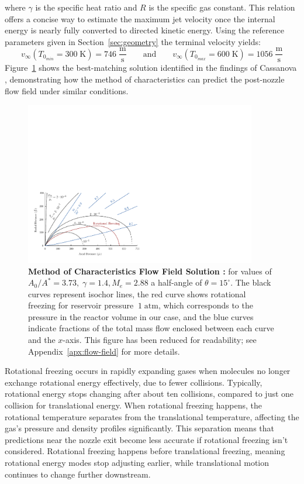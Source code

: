 		where $\gamma$ is the specific heat ratio and $R$ is the specific gas constant. This relation offers a concise way to estimate the maximum jet velocity once the internal energy is nearly fully converted to directed kinetic energy.
		Using the reference parameters given in Section~\ref{sec:geometry} the terminal velocity yields:
		$$
			v_\infty(T_{0_{min}} = 300\;\text{K}) = 746 \; \frac{\text{m}}{\text{s}}
				\qquad \text{and} \qquad
			v_\infty(T_{0_{max}} = 600\;\text{K}) = 1056 \; \frac{\text{m}}{\text{s}}
		$$
		\newpage
		Figure~\ref{fig:velocity-distribution-reduced} shows the best-matching solution identified in the findings of Cassanova \cite{Cassanova1965}, demonstrating how the method of characteristics can predict the post-nozzle flow field under similar conditions.
		\begin{figure}[H]
			\centering
		    \includegraphics[width=0.9\textwidth]{src/03_analytical-work/fig_velocity-distribution-reduced.pdf}
			\caption[Method of Characteristics Flow Field Solution \cite{Cassanova1965}]{
				\textbf{Method of Characteristics Flow Field Solution \cite{Cassanova1965}:}
				for values of $A_0/A^* = 3.73,\;\gamma=1.4,M_e =2.88$ a half-angle of $\theta = 15^\circ$.
				The black curves represent isochor lines, the red curve shows rotational freezing for reservoir pressure $~1\;\text{atm}$, which corresponds to the pressure in the reactor volume in our case, and the blue curves indicate fractions of the total mass flow enclosed between each curve and the $x$-axis. 
				This figure has been reduced for readability; see Appendix~\ref{apx:flow-field} for more details.
			}
			\label{fig:velocity-distribution-reduced}
		\end{figure}

		Rotational freezing occurs in rapidly expanding gases when molecules no longer exchange rotational energy effectively, due to fewer collisions.
		Typically, rotational energy stops changing after about ten collisions, compared to just one collision for translational energy.
		When rotational freezing happens, the rotational temperature separates from the translational temperature, affecting the gas's pressure and density profiles significantly.
		This separation means that predictions near the nozzle exit become less accurate if rotational freezing isn't considered.
		Rotational freezing happens before translational freezing, meaning rotational energy modes stop adjusting earlier, while translational motion continues to change further downstream.

